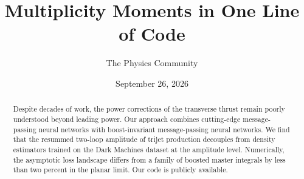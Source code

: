 \documentclass[11pt]{article}
\title{Multiplicity Moments in One Line of Code}
\author{The Physics Community}
\date{September 26, 2026}
\numberwithin{equation}{section}
\theoremstyle{definition}
\theoremstyle{remark}
\begin{document}
\maketitle
\begin{abstract}
Despite decades of work, the power corrections of the transverse thrust
remain poorly understood beyond leading power. Our approach combines
cutting-edge message-passing neural networks with boost-invariant
message-passing neural networks. We find that the resummed two-loop
amplitude of trijet production decouples from density estimators trained
on the Dark Machines dataset at the amplitude level. Numerically, the
asymptotic loss landscape differs from a family of boosted master
integrals by less than two percent in the planar limit. Our code is
publicly available.
\end{abstract}
\tableofcontents



\nocite{*}


\end{document}
